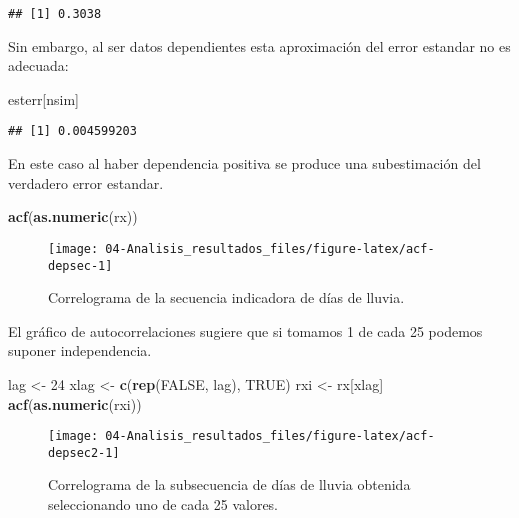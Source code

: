 \documentclass[
]{book}
\newenvironment{Shaded}{\begin{snugshade}}{\end{snugshade}}
\newcommand{\DecValTok}[1]{\textcolor[rgb]{0.00,0.00,0.81}{#1}}
\newcommand{\KeywordTok}[1]{\textcolor[rgb]{0.13,0.29,0.53}{\textbf{#1}}}
\newcommand{\NormalTok}[1]{#1}
\newcommand{\OtherTok}[1]{\textcolor[rgb]{0.56,0.35,0.01}{#1}}
\newcommand{\StringTok}[1]{\textcolor[rgb]{0.31,0.60,0.02}{#1}}
\theoremstyle{break}
\theoremstyle{definition}
\theoremstyle{definition}
\theoremstyle{definition}
\theoremstyle{remark}
\begin{document}
\begin{verbatim}
## [1] 0.3038
\end{verbatim}

Sin embargo, al ser datos dependientes esta aproximación del error estandar no es adecuada:

\begin{Shaded}
\begin{Highlighting}[]
\NormalTok{esterr[nsim]}
\end{Highlighting}
\end{Shaded}

\begin{verbatim}
## [1] 0.004599203
\end{verbatim}

En este caso al haber dependencia positiva se produce una
subestimación del verdadero error estandar.

\begin{Shaded}
\begin{Highlighting}[]
\KeywordTok{acf}\NormalTok{(}\KeywordTok{as.numeric}\NormalTok{(rx))}
\end{Highlighting}
\end{Shaded}

\begin{figure}[!htb]

{\centering \texttt{[image: 04-Analisis\_resultados\_files/figure-latex/acf-depsec-1]} 

}

\caption{Correlograma de la secuencia indicadora de días de lluvia.}\label{fig:acf-depsec}
\end{figure}

El gráfico de autocorrelaciones sugiere que si tomamos 1 de cada 25
podemos suponer independencia.

\begin{Shaded}
\begin{Highlighting}[]
\NormalTok{lag <-}\StringTok{ }\DecValTok{24}
\NormalTok{xlag <-}\StringTok{ }\KeywordTok{c}\NormalTok{(}\KeywordTok{rep}\NormalTok{(}\OtherTok{FALSE}\NormalTok{, lag), }\OtherTok{TRUE}\NormalTok{)}
\NormalTok{rxi <-}\StringTok{ }\NormalTok{rx[xlag]}
\KeywordTok{acf}\NormalTok{(}\KeywordTok{as.numeric}\NormalTok{(rxi))}
\end{Highlighting}
\end{Shaded}

\begin{figure}[!htb]

{\centering \texttt{[image: 04-Analisis\_resultados\_files/figure-latex/acf-depsec2-1]} 

}

\caption{Correlograma de la subsecuencia de días de lluvia obtenida seleccionando uno de cada 25 valores.}\label{fig:acf-depsec2}
\end{figure}
\end{document}
